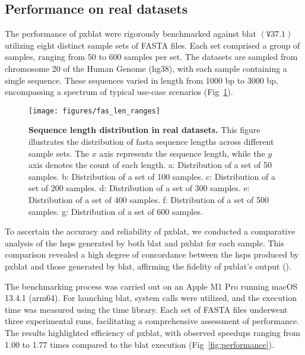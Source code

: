 \documentclass[10pt,letterpaper]{article}
\begin{document}
\subsection*{Performance on real datasets}

The performance of \gls{pxblat} were rigorously benchmarked against \gls{blat} \(\left(\mathtt{V}37.1\right)\) utilizing eight distinct sample sets of FASTA files.
Each set comprised a group of samples, ranging from 50 to 600 samples per set.
The datasets are sampled from chromosome 20 of the Human Genome (hg38), with each sample containing a single sequence.
These sequences varied in length from \num{1000} bp to \num{3000} bp, encompassing a spectrum of typical use-case scenarios (Fig~\ref{fig:fas_len}).

\begin{figure}[!h]
	\caption{{\bf Sequence length distribution in real datasets.} This figure illustrates the distribution of fasta sequence lengths across different sample sets. The \(x\) axis represents the sequence length, while the \(y\) axis denotes the count of each length.
		a: Distribution of a set of \num{50} samples.
		b: Distribution of a set of \num{100} samples.
		c: Distribution of a set of \num{200} samples.
		d: Distribution of a set of \num{300} samples.
		e: Distribution of a set of \num{400} samples.
		f: Distribution of a set of \num{500} samples.
		g: Distribution of a set of \num{600} samples.
	}
	\texttt{[image: figures/fas\_len\_ranges]}
	\label{fig:fas_len}
\end{figure}

To ascertain the accuracy and reliability of \gls{pxblat}, we conducted a comparative analysis of the \glspl{hsp} generated by both \gls{blat} and \gls{pxblat} for each sample.
This comparison revealed a high degree of concordance between the \glspl{hsp} produced by \gls{pxblat} and those generated by \gls{blat}, affirming the fidelity of \gls{pxblat}'s output ().

The benchmarking process was carried out on an Apple M1 Pro running macOS 13.4.1 (arm64).
For launching \gls{blat}, system calls were utilized, and the execution time was measured using the time library.
Each set of FASTA files underwent three experimental runs, facilitating a comprehensive assessment of performance.
The results highlighted efficiency of \gls{pxblat}, with observed speedups ranging from 1.00 to 1.77 times compared to the \gls{blat} execution (Fig~\ref{fig:performance}).
\end{document}

